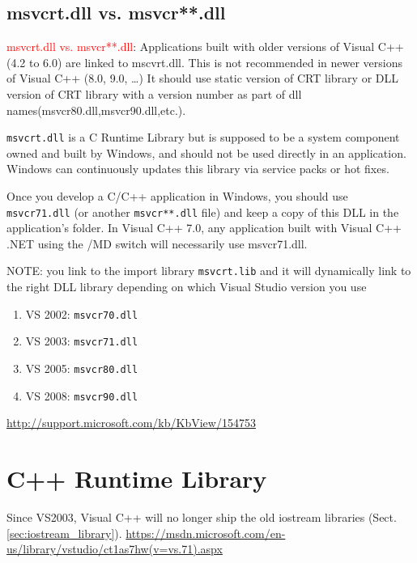 \subsection{msvcrt.dll vs. msvcr**.dll}

\textcolor{red}{msvcrt.dll vs. msvcr**.dll}: Applications built with older
versions of Visual C++ (4.2 to 6.0) are linked to mscvrt.dll. This is not
recommended in newer versions of Visual C++ (8.0, 9.0, \ldots) It should use
static version of CRT library or DLL version of CRT library with a version
number as part of dll names(msvcr80.dll,msvcr90.dll,etc.).

\begin{mdframed}

\verb!msvcrt.dll! is a C Runtime Library but is supposed to be a system
component owned and built by Windows, and should not be used directly in an
application. Windows can continuously updates this library via service packs or
hot fixes.


Once you develop a C/C++ application in Windows, you should use
\verb!msvcr71.dll! (or another \verb!msvcr**.dll! file) and keep a copy of this
DLL in the application's folder. In Visual C++ 7.0, any application built with
Visual C++ .NET using the /MD switch will necessarily use msvcr71.dll.
\end{mdframed}


NOTE: you link to the import library \verb!msvcrt.lib! and it will dynamically
link to the right DLL library depending on which Visual Studio version you use

\begin{enumerate}
  \item VS 2002: \verb!msvcr70.dll!
  \item VS 2003: \verb!msvcr71.dll!
  \item VS 2005: \verb!msvcr80.dll!
  \item VS 2008:  \verb!msvcr90.dll!
\end{enumerate} 
\url{http://support.microsoft.com/kb/KbView/154753}



\section{C++ Runtime Library}
\label{sec:C++_RT}

Since VS2003,  Visual C++ will no longer ship the old iostream libraries
(Sect.\ref{sec:iostream_library}).
\url{https://msdn.microsoft.com/en-us/library/vstudio/ct1as7hw(v=vs.71).aspx}

